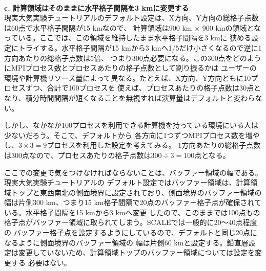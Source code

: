 {\small {\gt
{}}}\\


{\bf c. 計算領域はそのままに水平格子間隔を3 kmに変更する}\\

現実大気実験チュートリアルのデフォルト設定は、X方向、Y方向の総格子点数は60点で水平格子間隔が15 kmなので、
計算領域は900 km $\times$ 900 kmの領域となっている。ここでは、この領域を維持したまま水平格子間隔を3 kmに
狭める設定にトライする。水平格子間隔が15 kmから3 kmへ1/5だけ小さくなるので逆に1方向あたりの総格子点数は5倍、
つまり300点必要になる。この300点をどのようにMPIプロセス数とプロセスあたりの格子点数として割り振るかは
ユーザーの環境や計算機リソース量によって異なる。たとえば、X方向、Y方向ともに10プロセスずつ、合計で100プロセスを
使えば、プロセスあたりの格子点数は30点となり、積分時間間隔が短くなることを無視すれば演算量はデフォルトと変わらない。

しかし、なかなか100プロセスを利用できる計算機を持っている環境にいる人は少ないだろう。そこで、デフォルトから
各方向に1つずつMPIプロセス数を増やし、$3 \times 3 = 9$プロセスを利用した設定を考えてみる。
1方向あたりの総格子点数は300点なので、プロセスあたりの格子点数は$300 \div 3 = 100$点となる。

ここでの変更で気をつけなければならないことは、バッファー領域の幅である。現実大気実験チュートリアルの
デフォルト設定ではバッファー領域は、計算領域トップと東西南北の側面境界に設定されており、側面境界のバッファー領域の
幅は片側300 km、つまり15 km格子間隔で20点のバッファー格子点が確保されている。水平格子間隔を15 kmから3 kmへ変更
したので、このままでは100点もの格子点がバッファー領域に取られてしまう。SCALEでは一般的に20〜40点程度の
バッファー格子点を設定するようにしているので、デフォルトと同じ20点になるように側面境界のバッファー領域の
幅は片側60 kmと設定する。鉛直層設定は変更していないため、計算領域トップのバッファー領域については設定を変更する
必要はない。

